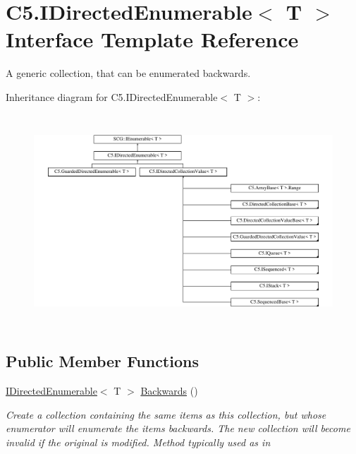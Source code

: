 \hypertarget{interface_c5_1_1_i_directed_enumerable}{}\section{C5.\+I\+Directed\+Enumerable$<$ T $>$ Interface Template Reference}
\label{interface_c5_1_1_i_directed_enumerable}


A generic collection, that can be enumerated backwards.  


Inheritance diagram for C5.\+I\+Directed\+Enumerable$<$ T $>$\+:\begin{figure}[H]
\begin{center}
\leavevmode
\includegraphics[height=7.989624cm]{interface_c5_1_1_i_directed_enumerable}
\end{center}
\end{figure}
\subsection*{Public Member Functions}
\begin{DoxyCompactItemize}
\item 
\hyperlink{interface_c5_1_1_i_directed_enumerable}{I\+Directed\+Enumerable}$<$ T $>$ \hyperlink{interface_c5_1_1_i_directed_enumerable_a826d9e7f29272dea7ebd48a38757df9e}{Backwards} ()
\begin{DoxyCompactList}\small\item\em Create a collection containing the same items as this collection, but whose enumerator will enumerate the items backwards. The new collection will become invalid if the original is modified. Method typically used as in \end{DoxyCompactList}\end{DoxyCompactItemize}
